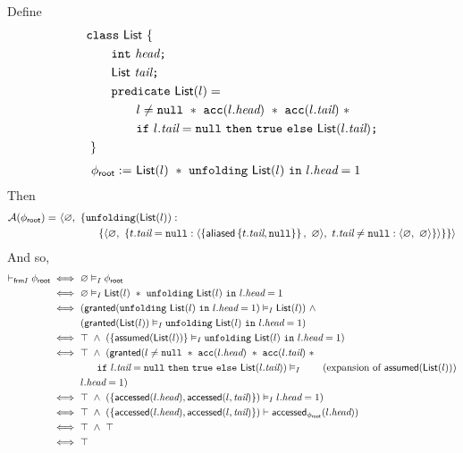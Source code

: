 Define
\begin{align*}
&\hspace{0em} \ttt{class} \ \List \ \{ \\
&\hspace{2em}   \int \ \vhead \ttt{;} \\
&\hspace{2em}   \List \ \vtail \ttt{;} \\
&\hspace{2em}   \ttt{predicate} \ \List(l) = \\
&\hspace{4em}     l \neq \cnull \ \ast \ \cacc(l.\vhead) \ \ast \ \cacc(l.\vtail) \ \ast \\
&\hspace{4em}     \cif \ l.\vtail = \cnull \ \cthen \ \ctrue \ \celse \ \List(l.\vtail) \ttt{;} \\
&\hspace{0em} \ \}
\end{align*}
%
\begin{align*}
{\phi_\textsf{root}} := & \
\textsf{List}(l) \ \ast \ \texttt{unfolding} \ \textsf{List}(l) \ \texttt{in} \ l.\textit{head} = 1
\end{align*}
Then
\begin{align*}
\mathcal{A}({\phi_\textsf{root}}) = & \
\langle
  \varnothing ,\
  \{
    \texttt{unfolding}(\textsf{List}(l)) : \\ & \hspace{4em}
    \{
      \langle
        \varnothing ,\
        \{
          t.\textit{tail} = \texttt{null} : \langle  \left\{ \textsf{aliased}\left\{ t.\textit{tail}, \texttt{null} \right\} \right\}  ,\ \varnothing \rangle ,\
          t.\textit{tail} \neq \texttt{null} : \langle \varnothing ,\ \varnothing \rangle
        \}
      \rangle
    \}
  \}
\rangle
\end{align*}
And so,
\begin{align*}
\selfframing \phiroot
\iff & \
\empty \frames \phiroot
\\ \iff & \
\empty \frames
\List(l) \ \ast \ \cunfolding \ \List(l) \ \cin \ l.\vhead = 1
\\ \iff & \
( \granted(\cunfolding \ \List(l) \ \cin \ l.\vhead = 1) \frames \List(l) ) \ \land \\ & \
( \granted(\List(l)) \frames \cunfolding \ \List(l) \ \cin \ l.\vhead = 1 )
\\ \iff & \
\top \ \land \ ( \set{ \assumed(\List(l)) } \frames \cunfolding \ \List(l) \ \cin \ l.\vhead = 1 )
\\ \iff & \
\top \ \land \
( \granted(
    l \neq \cnull \ \ast \ \cacc(l.\vhead) \ \ast \ \cacc(l.\vtail) \ \ast \\ & \hspace{2em}
    \cif \ l.\vtail = \cnull \ \cthen \ \ctrue \ \celse \ \List(l.\vtail) )
    \frames
    \tag{expansion of $\assumed(\List(l))$} \\ & \
  l.\vhead = 1 )
\\ \iff & \
\top \ \land \ ( \set{ \accessed(l.\vhead), \accessed(l,\vtail) } ) \frames l.\vhead = 1 )
\\ \iff & \
\top \ \land \ ( \set{ \accessed(l.\vhead), \accessed(l,\vtail) } ) \entails \accessed_{\phiroot}(l.\vhead) )
\\ \iff & \
\top \ \land \ \top
\\ \iff & \
\top
\end{align*}

